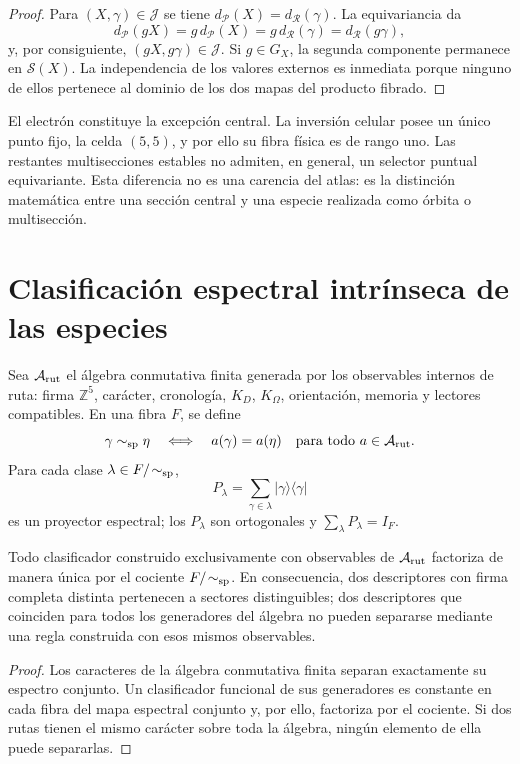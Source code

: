 \begin{proof}
Para \((X,\gamma)\in\mathcal J\) se tiene
\(d_{\mathcal P}(X)=d_{\mathcal R}(\gamma)\). La equivariancia da
\[
 d_{\mathcal P}(gX)=g\,d_{\mathcal P}(X)
 =g\,d_{\mathcal R}(\gamma)=d_{\mathcal R}(g\gamma),
\]
y, por consiguiente, \((gX,g\gamma)\in\mathcal J\). Si \(g\in G_X\), la
segunda componente permanece en \(\mathscr S(X)\). La independencia de los
valores externos es inmediata porque ninguno de ellos pertenece al dominio
de los dos mapas del producto fibrado.
\end{proof}

El electrón constituye la excepción central. La inversión celular posee un
único punto fijo, la celda \((5,5)\), y por ello su fibra física es de rango
uno. Las restantes multisecciones estables no admiten, en general, un selector
puntual equivariante. Esta diferencia no es una carencia del atlas: es la
distinción matemática entre una sección central y una especie realizada como
órbita o multisección.

\section{Clasificación espectral intrínseca de las especies}

Sea \(\mathcal A_{\rm rut}\) el álgebra conmutativa finita generada por los
observables internos de ruta: firma \(\mathbb Z^5\), carácter, cronología,
\(K_D\), \(K_\Omega\), orientación, memoria y lectores compatibles. En una
fibra \(F\), se define
\[
 \gamma\sim_{\rm sp}\eta
 \quad\Longleftrightarrow\quad
 a(\gamma)=a(\eta)\quad\text{para todo }a\in\mathcal A_{\rm rut}.
\]
Para cada clase \(\lambda\in F/\!\sim_{\rm sp}\),
\[
 P_\lambda=\sum_{\gamma\in\lambda}
 |\gamma\rangle\langle\gamma|
\]
es un proyector espectral; los \(P_\lambda\) son ortogonales y
\(\sum_\lambda P_\lambda=I_F\).

\begin{theorem}
Todo clasificador construido exclusivamente con observables de
\(\mathcal A_{\rm rut}\) factoriza de manera única por el cociente
\(F/\!\sim_{\rm sp}\). En consecuencia, dos descriptores con firma completa
distinta pertenecen a sectores distinguibles; dos descriptores que coinciden
para todos los generadores del álgebra no pueden separarse mediante una regla
construida con esos mismos observables.
\end{theorem}

\begin{proof}
Los caracteres de la álgebra conmutativa finita separan exactamente su
espectro conjunto. Un clasificador funcional de sus generadores es constante
en cada fibra del mapa espectral conjunto y, por ello, factoriza por el
cociente. Si dos rutas tienen el mismo carácter sobre toda la álgebra, ningún
elemento de ella puede separarlas.
\end{proof}

